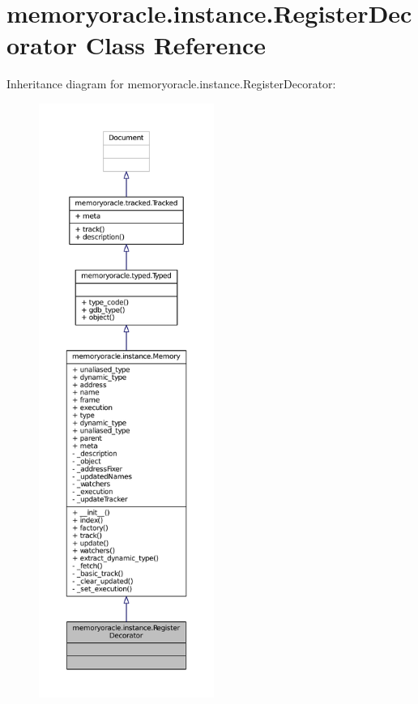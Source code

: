 \hypertarget{classmemoryoracle_1_1instance_1_1RegisterDecorator}{}\section{memoryoracle.\+instance.\+Register\+Decorator Class Reference}
\label{classmemoryoracle_1_1instance_1_1RegisterDecorator}


Inheritance diagram for memoryoracle.\+instance.\+Register\+Decorator\+:
\nopagebreak
\begin{figure}[H]
\begin{center}
\leavevmode
\includegraphics[height=550pt]{classmemoryoracle_1_1instance_1_1RegisterDecorator__inherit__graph}
\end{center}
\end{figure}


